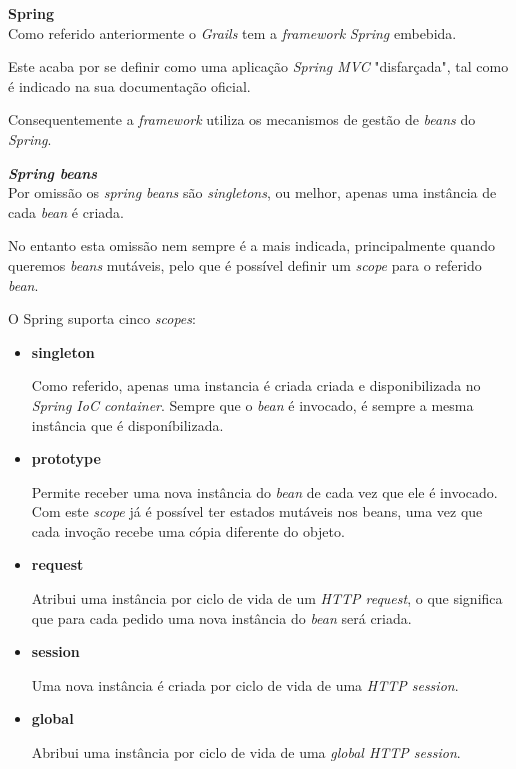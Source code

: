 \textbf{\large{Spring}}\\

  Como referido anteriormente o \textit{Grails} tem a \textit{framework} \textit{Spring} embebida.

  Este acaba por se definir como uma aplicação \textit{Spring MVC} "disfarçada", tal como é indicado na sua documentação oficial.

  Consequentemente a \textit{framework} utiliza os mecanismos de gestão de \textit{beans} do \textit{Spring}.

  \textbf{\textit{Spring beans}}\\

  Por omissão os \textit{spring beans} são \textit{singletons}, ou melhor, apenas uma instância de cada \textit{bean} é criada.

  No entanto esta omissão nem sempre é a mais indicada, principalmente quando queremos \textit{beans} mutáveis, pelo que é possível definir um \textit{scope} para o referido \textit{bean}.

  O Spring suporta cinco \textit{scopes}:

  \begin{itemize}
    \item \textbf{singleton}

      Como referido, apenas uma instancia é criada criada e disponibilizada no \textit{Spring IoC container}. Sempre que o \textit{bean} é invocado, é sempre a mesma instância que é disponíbilizada.

    \item \textbf{prototype}

      Permite receber uma nova instância do \textit{bean} de cada vez que ele é invocado. Com este \textit{scope} já é possível ter estados mutáveis nos beans, uma vez que cada invoção recebe uma cópia diferente do objeto.

    \item \textbf{request}

      Atribui uma instância por ciclo de vida de um \textit{HTTP request}, o que significa que para cada pedido uma nova instância do \textit{bean} será criada.

    \item \textbf{session}

      Uma nova instância é criada por ciclo de vida de uma \textit{HTTP session}.

    \item \textbf{global}

      Abribui uma instância por ciclo de vida de uma \textit{global HTTP session}.

  \end{itemize}

